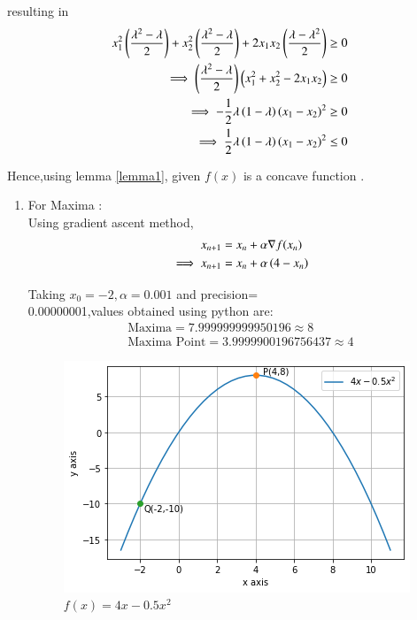 \documentclass[journal,12pt,twocolumn]{IEEEtran}
\begin{document}
resulting in
\begin{align}
    x_1^2\left(\frac{\lambda^2-\lambda}{2}\right)+x_2^2\left(\frac{\lambda^2-\lambda}{2}\right)+ 2x_1x_2\left(\frac{\lambda-\lambda^2}{2}\right) &\geq 0 \\
    \implies \left(\frac{\lambda^2-\lambda}{2}\right)\left(x_1^2+x_2^2-2x_1x_2\right) &\geq 0 \\
    \implies -\frac{1}{2}\lambda\left(1-\lambda\right)\left(x_1-x_2\right)^2 &\geq 0 \\
    \implies \frac{1}{2}\lambda\left(1-\lambda\right)\left(x_1-x_2\right)^2 &\leq 0
\end{align}

Hence,using lemma \ref{lemma1}, given $f(x)$ is a concave function .

\begin{enumerate}
    \item For Maxima : \\
    Using gradient ascent method,
    \begin{align}
        x_{n+1} &= x_n + \alpha \nabla f(x_n) \\
        \implies x_{n+1} &= x_n + \alpha \left(4-x_n\right)
    \end{align}
    
    Taking $x_0=-2,\alpha=0.001$ and precision= \\ 0.00000001,values obtained using python are:
    \begin{align}
        \boxed{\text{Maxima} = 7.999999999950196 \approx 8 }\\
        \boxed{\text{Maxima Point} = 3.9999900196756437 \approx 4}
    \end{align}
    
    \begin{figure}[!ht]
    \centering
    \includegraphics[width=\columnwidth]{Figure15}
    \caption{$f(x)=4x-0.5x^2$}
    \label{f(x)}	
    \end{figure}


\end{enumerate}
\end{document}
